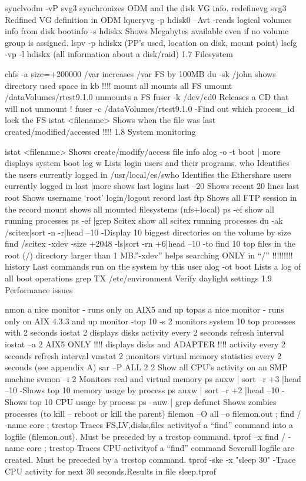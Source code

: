 synclvodm -vP svg3    synchronizes ODM and the disk VG info.
redefinevg svg3    Redfined VG definition in ODM
lqueryvg -p hdisk0 –Avt  -reads logical volumes info from disk
bootinfo -s hdiskx    Shows Megabytes available even if no volume group is assigned.
lspv -p  hdiskx     (PP's used, location on disk, mount point)
lscfg -vp -l hdiskx      (all information about a disk/raid)
1.7    Filesystem

chfs -a size=+200000 /var    increases /var FS by 100MB
du -sk /john          shows directory used space in kb !!!!
mount all    mounts all FS
umount /dataVolumes/rtest9.1.0    unmounts a FS
fuser -k /dev/cd0    Releases a CD that will not unmount !
fuser -c /dataVolumes/rtest9.1.0  -Find out which process_id lock the FS
istat <filename>    Shows when the file was last created/modified/accessed !!!!
1.8    System monitoring

istat <filename>    Shows create/modify/access file info
alog -o -t boot | more    displays system boot log
w    Lists login users and their programs.
who    Identifies the users currently logged in
/usr/local/es/swho     Identifies the Ethershare users currently logged in
last  |more    shows last logins
last –20    Shows recent 20 lines
last root    Shows username ‘root’ login/logout record
last ftp     Shows all FTP session in the record
mount    shows all mounted filesystems (nfs+local)
ps -ef    show all running processes
ps -ef |grep Scitex     show all scitex running processes
du -ak /scitex|sort -n -r|head –10  -Display 10 biggest directories on the volume by size
find /scitex -xdev -size +2048 -ls|sort -rn +6|head –10  -to find 10 top files in the root (/) directory larger than 1 MB.”-xdev” helps searching ONLY in “/” !!!!!!!!!
history    Last commands run on the system by this user
alog -ot boot    Lists a log of all boot operations
grep TX /etc/environment    Verify daylight settings
1.9    Performance issues

nmon    a nice monitor - runs only on AIX5 and up
topas    a nice monitor - runs only on AIX 4.3.3 and up
monitor -top 10 -s 2    monitors system 10  top processes with 2 seconds
iostat 2    displays disks activity every 2 seconds refresh interval
iostat –a 2            AIX5 ONLY !!!!
displays disks and ADAPTER !!!! activity every 2 seconds refresh interval
vmstat 2    ;monitors virtual memory statistics every 2 seconds (see appendix A)
sar –P ALL 2 2    Show all CPU’s activity on an SMP machine
svmon –i 2    Monitors real and virtual memory
ps auxw | sort –r +3 |head –10  -Shows top 10 memory usage by process
ps auxw | sort –r +2 |head –10  -Shows top 10 CPU usage by process
ps –auw | grep defunct    Shows zombies processes (to kill – reboot or kill the parent)
filemon –O all –o filemon.out ; find / -name core ; trcstop    Traces FS,LV,disks,files activityof a “find” command into a logfile (filemon.out). Must be preceded by a trcstop command.
tprof –x find / -name core ; trcstop    Traces CPU activityof a “find” command Severall logfile are created. Must be preceded by a trcstop command.
tprof -ske -x "sleep 30"    -Trace CPU activity for next 30 seconds.Results in file sleep.tprof

